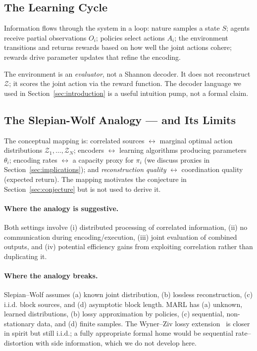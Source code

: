\documentclass[10pt, letterpaper]{article}
\begin{document}
\subsection{The Learning Cycle}

Information flows through the system in a loop: nature samples a state $S$; agents receive partial observations $O_i$; policies select actions $A_i$; the environment transitions and returns rewards based on how well the joint actions cohere; rewards drive parameter updates that refine the encoding.

The environment is an \emph{evaluator}, not a Shannon decoder. It does not reconstruct $\mathcal{Z}$; it scores the joint action via the reward function. The decoder language we used in Section~\ref{sec:introduction} is a useful intuition pump, not a formal claim.

\subsection{The Slepian-Wolf Analogy --- and Its Limits}
\label{sec:sw-analogy}

The conceptual mapping is: correlated sources $\leftrightarrow$ marginal optimal action distributions $\mathcal{Z}_1, \ldots, \mathcal{Z}_N$; encoders $\leftrightarrow$ learning algorithms producing parameters $\theta_i$; encoding rates $\leftrightarrow$ a capacity proxy for $\pi_i$ (we discuss proxies in Section~\ref{sec:implications}); and \emph{reconstruction quality} $\leftrightarrow$ coordination quality (expected return). The mapping motivates the conjecture in Section~\ref{sec:conjecture} but is not used to derive it.

\paragraph{Where the analogy is suggestive.} Both settings involve (i) distributed processing of correlated information, (ii) no communication during encoding/execution, (iii) joint evaluation of combined outputs, and (iv) potential efficiency gains from exploiting correlation rather than duplicating it.

\paragraph{Where the analogy breaks.} Slepian--Wolf assumes (a) known joint distribution, (b) lossless reconstruction, (c) i.i.d. block sources, and (d) asymptotic block length. MARL has (a) unknown, learned distributions, (b) lossy approximation by policies, (c) sequential, non-stationary data, and (d) finite samples. The Wyner--Ziv lossy extension~\cite{wyner1976} is closer in spirit but still i.i.d.; a fully appropriate formal home would be sequential rate--distortion with side information, which we do not develop here.
\end{document}
